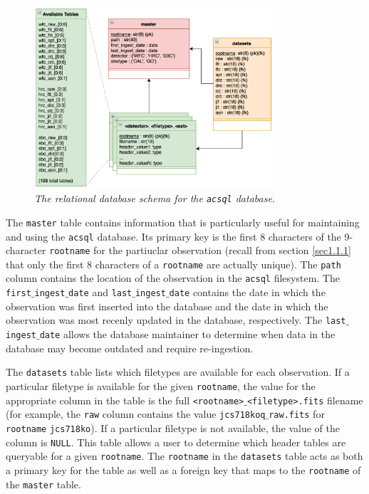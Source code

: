 \documentclass[10pt,journal,compsoc]{IEEEtran}
\begin{document}
\begin{figure}[!h]
\centering
\includegraphics[width=3.5in]{./figures/schema.png}
\caption{\textit{The relational database schema for the \texttt{acsql} database.}
\label{fig11}}
\end{figure}

The \texttt{master} table contains information that is particularly useful for maintaining and using the \texttt{acsql} database.  Its primary key is the first 8 characters of the
9-character \texttt{rootname} for the partiuclar observation (recall from section \ref{sec1.1.1} that only the first 8 characters of a \texttt{rootname} are actually unique).
The \texttt{path} column contains the location of the observation in the \texttt{acsql} filesystem.  The \texttt{first$\_$ingest$\_$date} and \texttt{last$\_$ingest$\_$date} contains
the date in which the observation was first inserted into the database and the date in which the observation was most recenly updated in the database, respectively. The
\texttt{last$\_$ingest$\_$date} allows the database maintainer to determine when data in the database may become outdated and require re-ingestion.

The \texttt{datasets} table lists which filetypes are available for each observation.  If a particular filetype is available for the given \texttt{rootname}, the value for the
appropriate column in the table is the full \texttt{<rootname>$\_$<filetype>.fits} filename (for example, the \texttt{raw} column contains the value \texttt{jcs718koq$\_$raw.fits} for
\texttt{rootname} \texttt{jcs718ko}). If a particular filetype is not available, the value of the column is \texttt{NULL}. This table allows a user to determine which header tables are
queryable for a given \texttt{rootname}.  The \texttt{rootname} in the \texttt{datasets} table acts as both a primary key for the table as well as a foreign key that maps to the
\texttt{rootname} of the \texttt{master} table.
\end{document}
